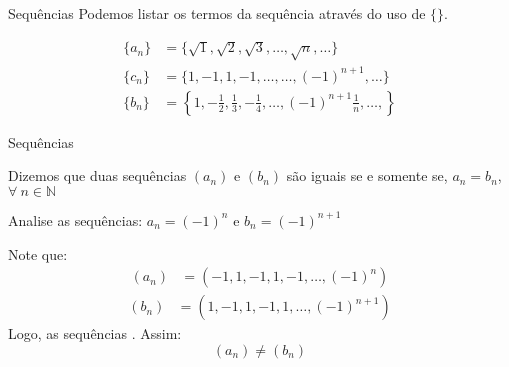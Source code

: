 \documentclass[hyperref={pdfpagelabels=false}]{beamer}
\begin{document}
\begin{frame}{Sequências}
 Podemos listar os termos da sequência através do uso de $\{ \}$. \pause 
 
 \begin{example}
  \begin{align*}
   \{a_n\} &= \{ \sqrt{1},\sqrt{2}, \sqrt{3}, \dots, \sqrt{n}, \dots \} \\ 
   \{c_n\} &= \{1, -1, 1, -1, \dots, \dots, (-1)^{n+1}, \dots \} \\
   \{b_n\} &= \left\{ 1, -\frac{1}{2}, \frac{1}{3}, -\frac{1}{4}, \dots, (-1)^{n+1}\frac{1}{n}, \dots, \right\}
  \end{align*}
 \end{example}

\end{frame}


\begin{frame}{Sequências}
 \begin{definition}
  Dizemos que duas sequências $(a_n)$ e $(b_n)$ são iguais se e somente se, $a_n = b_n$, $\forall ~n \in \mathbb{N}$
 \end{definition} \pause
 
 \begin{example}
  Analise as sequências: $a_n = (-1)^n$ e $b_n = (-1)^{n+1}$
 \end{example} \pause
 
 Note que:
 \begin{align*}
  (a_n) &= (-1,1,-1,1,-1,\dots,(-1)^n) 
 \end{align*}\pause
  \begin{align*}
  (b_n) &= (1,-1,1,-1,1,\dots, (-1)^{n+1})
 \end{align*}\pause
Logo, as sequências . Assim: $$(a_n) \neq (b_n)$$

\end{frame}
\end{document}
